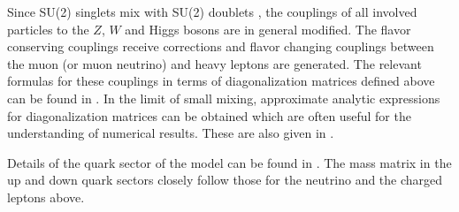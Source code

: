 Since SU(2) singlets mix with SU(2) doublets , the couplings of all involved particles to the $Z$, $W$ and Higgs bosons are in general modified. The flavor conserving couplings receive corrections and flavor changing couplings between the muon (or muon neutrino)  and heavy leptons are generated. The relevant formulas for these couplings in terms of diagonalization matrices defined above can be found in . In the limit of small mixing, approximate analytic expressions  for diagonalization matrices can be obtained which are often useful for the understanding of numerical results. These are also given in .

Details of the quark sector of the model can be found in .
The mass matrix in the up and down quark sectors closely follow those for the neutrino and the charged leptons above. 


%
%

